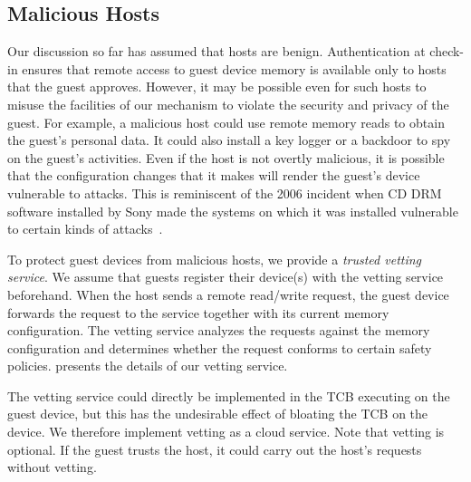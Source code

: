 
\subsection{Malicious Hosts} 
\label{section:usagemodel:malicious}
%
Our discussion so far has assumed that hosts are benign. Authentication at
check-in ensures that remote access to guest device memory is available only to
hosts that the guest approves. However, it may be possible even for such hosts
to misuse the facilities of our mechanism to violate the security and privacy
of the guest. For example, a malicious host could use remote memory reads to
obtain the guest's personal data. It could also install a key logger or a
backdoor to spy on the guest's activities. Even if the host is not overtly
malicious, it is possible that the configuration changes that it makes will
render the guest's device vulnerable to attacks. This is reminiscent of the
2006 incident when CD DRM software installed by Sony made the systems on which
it was installed vulnerable to certain kinds of attacks~\cite{sonydrm:sec06}.

To protect guest devices from malicious hosts, we provide a \textit{trusted
vetting service}. We assume that guests register their device(s) with the
vetting service beforehand. When the host sends a remote read/write request,
the guest device forwards the request to the service together with its current
memory configuration. The vetting service analyzes the requests against the
memory configuration and determines whether the request conforms to certain
safety policies.  presents the details of our vetting
service.

The vetting service could directly be implemented in the TCB executing on the
guest device, but this has the undesirable effect of bloating the TCB on the
device. We therefore implement vetting as a cloud service.  Note that vetting
is optional. If the guest trusts the host, it could carry out the host's
requests without vetting.



